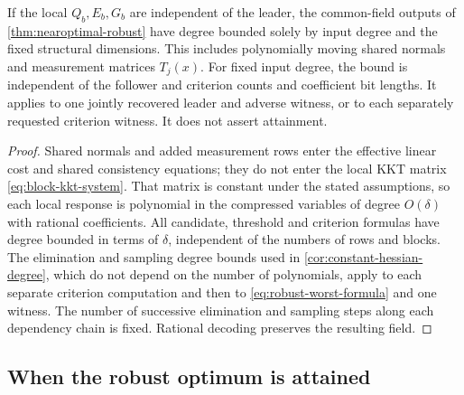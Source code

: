\begin{corollary}
\label{cor:robust-degree}
If the local $Q_b,E_b,G_b$ are independent of the leader, the common-field
outputs of \cref{thm:nearoptimal-robust} have degree bounded solely by
input degree and the fixed structural dimensions. This includes
polynomially moving shared normals and measurement matrices $T_j(x)$.
For fixed input degree, the bound is independent of the follower and
criterion counts and coefficient bit lengths. It applies to one jointly
recovered leader and adverse witness, or to each separately requested
criterion witness. It does not assert attainment.
\end{corollary}
\begin{proof}
Shared normals and added measurement rows enter the effective linear
cost and shared consistency equations; they do not enter the local KKT
matrix \eqref{eq:block-kkt-system}. That matrix is constant under the
stated assumptions, so each local response is polynomial in the
compressed variables of degree $O(\delta)$ with rational coefficients.
All candidate, threshold and criterion formulas have degree bounded
in terms of $\delta$, independent of the numbers of rows and blocks.
The elimination and sampling degree bounds used in
\cref{cor:constant-hessian-degree}, which do not depend on the number of
polynomials, apply to each separate criterion computation and then to \eqref{eq:robust-worst-formula} and
one witness. The number of successive elimination and sampling steps along each
dependency chain is fixed. Rational
decoding preserves the resulting field.
\end{proof}

\subsection{When the robust optimum is attained}\label{subsec:robust-attainment}

